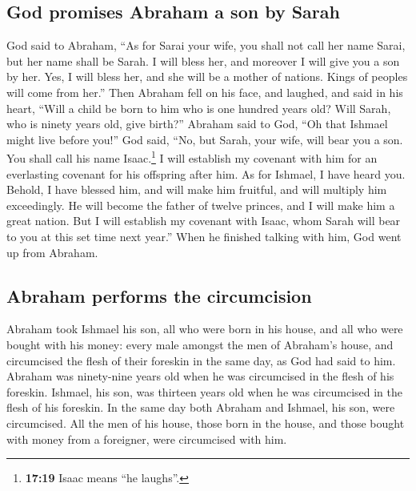 \hypertarget{god-promises-abraham-a-son-by-sarah}{%
\subsection{God promises Abraham a son by
Sarah}\label{god-promises-abraham-a-son-by-sarah}}

 God said to Abraham, ``As for Sarai your wife, you shall
not call her name Sarai, but her name shall be Sarah.  I
will bless her, and moreover I will give you a son by her. Yes, I will
bless her, and she will be a mother of nations. Kings of peoples will
come from her.''  Then Abraham fell on his face, and
laughed, and said in his heart, ``Will a child be born to him who is one
hundred years old? Will Sarah, who is ninety years old, give birth?''
 Abraham said to God, ``Oh that Ishmael might live before
you!''  God said, ``No, but Sarah, your wife, will bear
you a son. You shall call his name Isaac.\footnote{\textbf{17:19} Isaac
  means ``he laughs''.} I will establish my covenant with him for an
everlasting covenant for his offspring after him.  As for
Ishmael, I have heard you. Behold, I have blessed him, and will make him
fruitful, and will multiply him exceedingly. He will become the father
of twelve princes, and I will make him a great nation. 
But I will establish my covenant with Isaac, whom Sarah will bear to you
at this set time next year.''  When he finished talking
with him, God went up from Abraham.

\hypertarget{abraham-performs-the-circumcision}{%
\subsection{Abraham performs the
circumcision}\label{abraham-performs-the-circumcision}}

 Abraham took Ishmael his son, all who were born in his
house, and all who were bought with his money: every male amongst the
men of Abraham's house, and circumcised the flesh of their foreskin in
the same day, as God had said to him.  Abraham was
ninety-nine years old when he was circumcised in the flesh of his
foreskin.  Ishmael, his son, was thirteen years old when
he was circumcised in the flesh of his foreskin.  In the
same day both Abraham and Ishmael, his son, were circumcised.
 All the men of his house, those born in the house, and
those bought with money from a foreigner, were circumcised with him.

